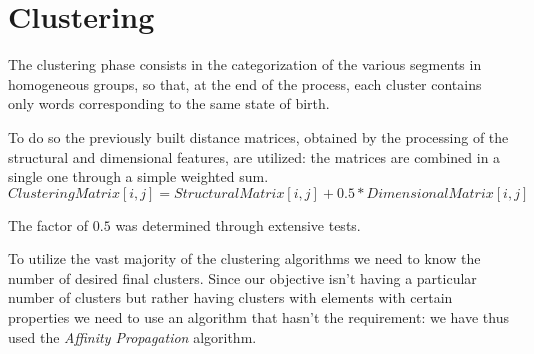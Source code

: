 \section{Clustering}
The clustering phase consists in the categorization of the various segments in homogeneous groups, so that, at the end of the process, each cluster contains only words corresponding to the same state of birth.

To do so the previously built distance matrices, obtained by the processing of the structural and dimensional features, are utilized: the matrices are combined in a single one through a simple weighted sum.
\begin{displaymath} 
ClusteringMatrix[i,j]= StructuralMatrix[i,j]+0.5*DimensionalMatrix[i,j]
\end{displaymath}

The factor of $0.5$ was determined through extensive tests.

To utilize the vast majority of the clustering algorithms we need to know the number of desired final clusters.
Since our objective isn't having a particular number of clusters but rather having clusters with elements with certain properties we need to use an algorithm that hasn't the requirement: we have thus used the \emph{Affinity Propagation} algorithm.
